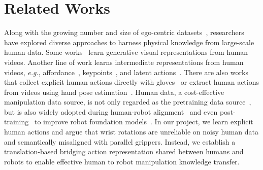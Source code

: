 \section{Related Works}

% 
Along with the growing number and size of ego-centric datasets~\cite{zhou2018towards,goyal2017something,miech2019howto100m,damen2018scaling,grauman2022ego4d,grauman2024ego,hoque2025egodex}, researchers have explored diverse approaches to harness physical knowledge from large-scale human data.
% 
Some works~\cite{cheang2024gr,wu2023unleashing,hu2024video,li2026causal} learn generative visual representations from human videos.
% 
Another line of work learns intermediate representations from human videos, \textit{e.g.}, affordance~\cite{bahl2023affordances,bahl2022human}, keypoints~\cite{wang2023mimicplay,wen2023any,bharadhwaj2024track2act}, and latent actions~\cite{bruce2024genie,ye2024latent,bu2025agibot,chen2025moto,fan2025xr,bjorck2025gr00t}.
% 
There are also works that collect explicit human actions directly with gloves~\cite{xu2025dexumi,tao2025dexwild} or extract human actions from videos using hand pose estimation~\cite{kareer2025emergence,kareer2025egomimic,punamiya2025egobridge,zhu2026emma,luo2026being,luo2025being}.
% 
Human data, a cost-effective manipulation data source, is not only regarded as the pretraining data source~\cite{zheng2026egoscale,cheang2024gr,bjorck2025gr00t}, but is also widely adopted during human-robot alignment~\cite{kareer2025egomimic,punamiya2025egobridge,zhu2026emma,shi2026egohumanoid} and even post-training~\cite{ye2026world,cheang2025gr3,kareer2025emergence} to improve robot foundation models~\cite{black2024pi_0,intelligence2025pi_0.5,ye2026world}.
% 
In our project, we learn explicit human actions and argue that wrist rotations are unreliable on noisy human data and semantically misaligned with parallel grippers.
% 
Instead, we establish a translation-based bridging action representation shared between humans and robots to enable effective human to robot manipulation knowledge transfer.




